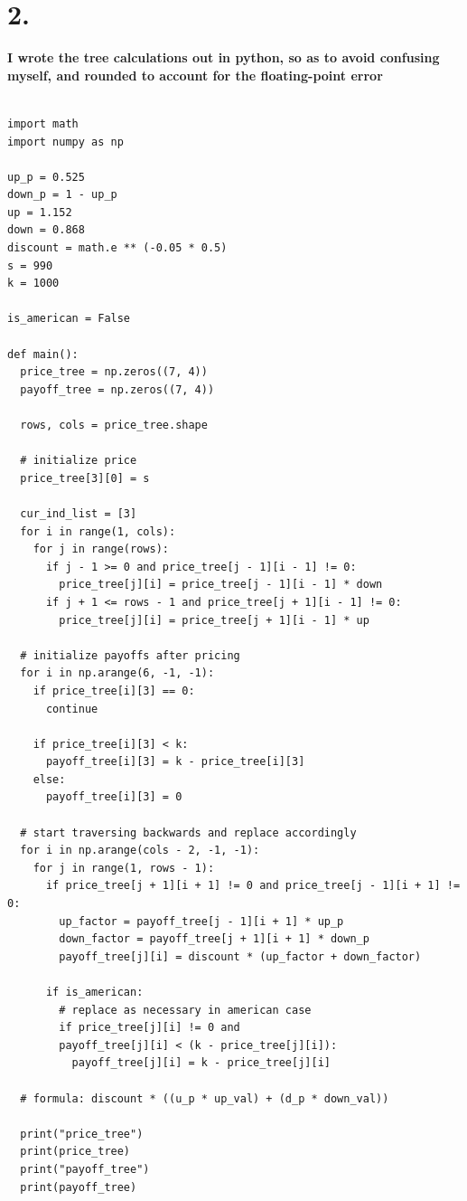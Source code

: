 \documentclass{article}
\begin{document}
\section*{2.}
{\Large

\textbf{I wrote the tree calculations out in python, so as to avoid confusing myself, and rounded to account for the floating-point error}

\begin{verbatim}

import math
import numpy as np

up_p = 0.525
down_p = 1 - up_p
up = 1.152
down = 0.868
discount = math.e ** (-0.05 * 0.5)
s = 990
k = 1000

is_american = False

def main():
  price_tree = np.zeros((7, 4))
  payoff_tree = np.zeros((7, 4))

  rows, cols = price_tree.shape
  
  # initialize price
  price_tree[3][0] = s
  
  cur_ind_list = [3]
  for i in range(1, cols):
    for j in range(rows):
      if j - 1 >= 0 and price_tree[j - 1][i - 1] != 0:
        price_tree[j][i] = price_tree[j - 1][i - 1] * down
      if j + 1 <= rows - 1 and price_tree[j + 1][i - 1] != 0:
        price_tree[j][i] = price_tree[j + 1][i - 1] * up

  # initialize payoffs after pricing
  for i in np.arange(6, -1, -1):
    if price_tree[i][3] == 0:
      continue

    if price_tree[i][3] < k:
      payoff_tree[i][3] = k - price_tree[i][3]
    else:
      payoff_tree[i][3] = 0

  # start traversing backwards and replace accordingly
  for i in np.arange(cols - 2, -1, -1):
    for j in range(1, rows - 1):
      if price_tree[j + 1][i + 1] != 0 and price_tree[j - 1][i + 1] != 0:
        up_factor = payoff_tree[j - 1][i + 1] * up_p
        down_factor = payoff_tree[j + 1][i + 1] * down_p
        payoff_tree[j][i] = discount * (up_factor + down_factor)
      
      if is_american:
        # replace as necessary in american case
        if price_tree[j][i] != 0 and 
        payoff_tree[j][i] < (k - price_tree[j][i]):
          payoff_tree[j][i] = k - price_tree[j][i]

  # formula: discount * ((u_p * up_val) + (d_p * down_val))

  print("price_tree")
  print(price_tree)
  print("payoff_tree")
  print(payoff_tree)
  


\end{verbatim}}
\end{document}
